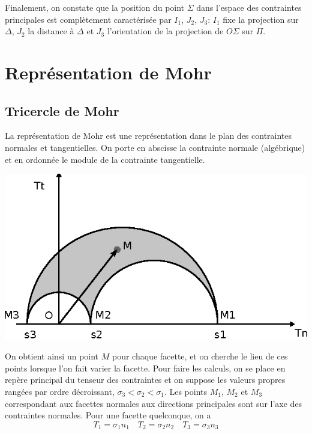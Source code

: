 Finalement, on constate que la position du point $\Sigma$ dans l'espace des contraintes principales est complètement caractérisée par $I_1$, $J_2$, $J_3$: $I_1$ fixe la projection sur $\Delta$, $J_2$ la distance à $\Delta$ et $J_3$ l'orientation de la projection de $O\Sigma$ sur $\Pi$.

\section{Représentation de Mohr} \label{sec:Ch02-3}
\subsection{Tricercle de Mohr} \label{ssec:Ch02-3.1}
La représentation de Mohr est une représentation dans le plan des contraintes normales et tangentielles. 
On porte en abscisse la contrainte normale (algébrique) et en ordonnée le module de la contrainte tangentielle.
\begin{center}
    \includegraphics{../images/T1_Ch02-0015}
\end{center}
On obtient ainsi un point $M$ pour chaque facette, et on cherche le lieu de ces points lorsque l'on fait varier la facette.
Pour faire les calculs, on se place en repère principal du tenseur des contraintes et on suppose les valeurs propres rangées par ordre décroissant, $\sigma_3 < \sigma_2 < \sigma_1$.
Les points $M_1$, $M_2$ et $M_3$ correspondant aux facettes normales aux directions principales sont sur l'axe des contraintes normales.
Pour une facette quelconque, on a
\begin{displaymath}
    T_1 = \sigma_1 n_1 \quad T_2 = \sigma_2 n_2 \quad T_3 = \sigma_3 n_3
\end{displaymath}

